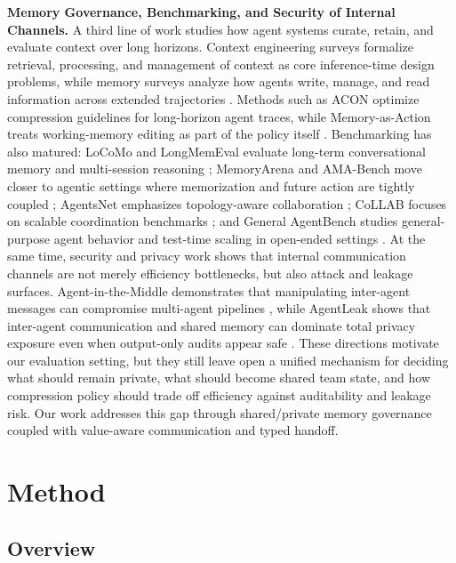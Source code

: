 \documentclass{article} %
\begin{document}
\textbf{Memory Governance, Benchmarking, and Security of Internal Channels.}
A third line of work studies how agent systems curate, retain, and evaluate context over long horizons. Context engineering surveys formalize retrieval, processing, and management of context as core inference-time design problems, while memory surveys analyze how agents write, manage, and read information across extended trajectories \cite{mei2025contextengineering,zhang2024memorymechanism,du2026memoryautonomous}. Methods such as ACON optimize compression guidelines for long-horizon agent traces, while Memory-as-Action treats working-memory editing as part of the policy itself \cite{kang2025acon,zhang2025memoryasaction}. Benchmarking has also matured: LoCoMo and LongMemEval evaluate long-term conversational memory and multi-session reasoning \cite{maharana2024locomo,wu2025longmemeval}; MemoryArena and AMA-Bench move closer to agentic settings where memorization and future action are tightly coupled \cite{he2026memoryarena,zhao2026amabench}; AgentsNet emphasizes topology-aware collaboration \cite{groetschla2026agentsnet}; CoLLAB focuses on scalable coordination benchmarks \cite{mahmud2025collab}; and General AgentBench studies general-purpose agent behavior and test-time scaling in open-ended settings \cite{li2026generalagentbench}. At the same time, security and privacy work shows that internal communication channels are not merely efficiency bottlenecks, but also attack and leakage surfaces. Agent-in-the-Middle demonstrates that manipulating inter-agent messages can compromise multi-agent pipelines \cite{he2025aitm}, while AgentLeak shows that inter-agent communication and shared memory can dominate total privacy exposure even when output-only audits appear safe \cite{elyagoubi2026agentleak}. These directions motivate our evaluation setting, but they still leave open a unified mechanism for deciding what should remain private, what should become shared team state, and how compression policy should trade off efficiency against auditability and leakage risk. Our work addresses this gap through shared/private memory governance coupled with value-aware communication and typed handoff.

\section{Method}
\label{sec:method}

\subsection{Overview}
\end{document}
